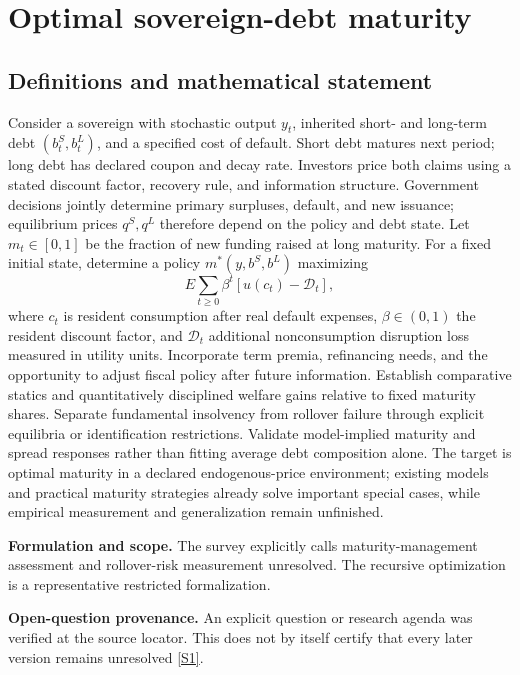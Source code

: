 \documentclass[11pt]{article}
\newcommand{\sref}[2]{\hyperlink{source:#1:#2}{[S#2]}}
\begin{document}
\section*{Optimal sovereign-debt maturity}\label{30007538}
\subsection{Definitions and mathematical statement}
Consider a sovereign with stochastic output \(y_t\), inherited short- and long-term debt \((b_t^S,b_t^L)\), and a specified cost of default. Short debt matures next period; long debt has declared coupon and decay rate. Investors price both claims using a stated discount factor, recovery rule, and information structure. Government decisions jointly determine primary surpluses, default, and new issuance; equilibrium prices \(q^S,q^L\) therefore depend on the policy and debt state.
Let \(m_t\in[0,1]\) be the fraction of new funding raised at long maturity. For a fixed initial state, determine a policy \(m^*(y,b^S,b^L)\) maximizing
\[
E\sum_{t\ge0}\beta^t
[u(c_t)-\mathcal D_t],
\]
where \(c_t\) is resident consumption after real default expenses, \(\beta\in(0,1)\) the resident discount factor, and \(\mathcal D_t\) additional nonconsumption disruption loss measured in utility units. Incorporate term premia, refinancing needs, and the opportunity to adjust fiscal policy after future information. Establish comparative statics and quantitatively disciplined welfare gains relative to fixed maturity shares. Separate fundamental insolvency from rollover failure through explicit equilibria or identification restrictions. Validate model-implied maturity and spread responses rather than fitting average debt composition alone. The target is optimal maturity in a declared endogenous-price environment; existing models and practical maturity strategies already solve important special cases, while empirical measurement and generalization remain unfinished.

\par\textbf{Formulation and scope.} The survey explicitly calls maturity-management assessment and rollover-risk measurement unresolved. The recursive optimization is a representative restricted formalization.

\par\textbf{Open-question provenance.} An explicit question or research agenda was verified at the source locator. This does not by itself certify that every later version remains unresolved \sref{30007538}{1}.
\end{document}

